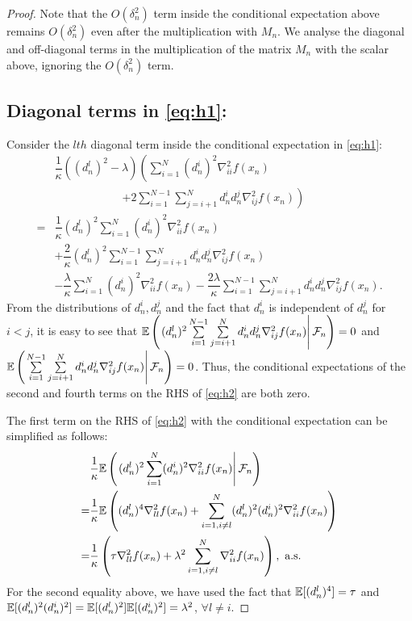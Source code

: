 \begin{proof}
Note that the $O(\delta_n^2)$ term inside the conditional expectation above remains $O(\delta_n^2)$ even after the multiplication with $M_n$.
We analyse the diagonal and off-diagonal terms in the multiplication of the matrix $M_n$ with the scalar above, ignoring the $O(\delta_n^2)$ term. 

\subsection*{Diagonal terms in \eqref{eq:h1}:}

Consider the $lth$ diagonal term inside the conditional expectation in \eqref{eq:h1}:
\begin{align}
& \dfrac{1}{\kappa}  \left((d_n^l)^2-\lambda\right) \left(\sum\limits_{i=1}^N (d_n^i)^2 \nabla^2_{ii} f(x_n)\right. \nonumber\\
&\hspace{6em}\left. + 2\sum\limits_{i=1}^{N-1}\sum\limits_{j=i+1}^N d_n^i d_n^j \nabla^2_{ij} f(x_n)\right)\nonumber\\
=& \dfrac{1}{\kappa} (d_n^l)^2 \sum\limits_{i=1}^N (d_n^i)^2 \nabla^2_{ii} f(x_n) \nonumber\\
& + \dfrac{2}{\kappa} (d_n^l)^2\sum\limits_{i=1}^{N-1}\sum\limits_{j=i+1}^N d_n^i d_n^j \nabla^2_{ij} f(x_n)\nonumber\\
& - \dfrac{ \lambda}{\kappa} \sum\limits_{i=1}^N (d_n^i)^2 \nabla^2_{ii} f(x_n) - \dfrac{2 \lambda}{ \kappa} \sum\limits_{i=1}^{N-1}\sum\limits_{j=i+1}^N d_n^i d_n^j \nabla^2_{ij} f(x_n).\label{eq:h2}
\end{align}
From the distributions of $d_n^i,d_n^j$ and the fact that $d_n^i$ is independent of $d_n^j$ for $i<j$, it is easy to see that $\mathbb{E}\left(\left. (d_n^l)^2\sum\limits_{i=1}^{N-1}\sum\limits_{j=i+1}^N d_n^i d_n^j \nabla^2_{ij} f(x_n) \right| \mathcal{F}_n\right) = 0$ and $\mathbb{E}\left(\left.\sum\limits_{i=1}^{N-1}\sum\limits_{j=i+1}^N d_n^i d_n^j \nabla^2_{ij} f(x_n) \right| \mathcal{F}_n\right) = 0$. Thus, the conditional expectations of the second and fourth terms on the RHS of \eqref{eq:h2} are both zero. 

The first term on the RHS of \eqref{eq:h2} with the conditional expectation can be simplified as follows:
\begin{align}\label{eq:term1lem1}
&\dfrac{1}{\kappa} \E\left(\left. (d_n^l)^2 \sum\limits_{i=1}^N (d_n^i)^2 \nabla^2_{ii} f(x_n) \right| \F_n\right)\nonumber\\
= & \dfrac{1}{\kappa} \E\left((d_n^l)^4 \nabla^2_{ll} f(x_n) + \sum\limits_{i=1,i\ne l}^N (d_n^l)^2(d_n^i)^2 \nabla^2_{ii} f(x_n) \right)\nonumber\\
= & \dfrac{1}{\kappa} \left( \tau \nabla^2_{ll} f(x_n) + \lambda^2 \sum\limits_{i=1,i\ne l}^N  \nabla^2_{ii} f(x_n) \right), \text{ a.s.}
\end{align} 
For the second equality above, we have used the fact that $\mathbb{E}[(d_n^l)^4] =  \tau$ and $\mathbb{E}[(d_n^l)^2 (d_n^i)^2] = \mathbb{E}[(d_n^l)^2] \mathbb{E}[(d_n^i)^2] = \lambda^2$, $\forall l \ne i$.


\end{proof}
